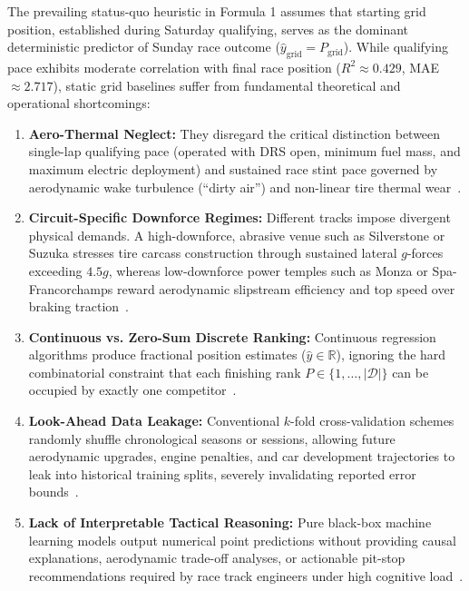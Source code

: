 \documentclass[journal]{IEEEtran}
\begin{document}
The prevailing status-quo heuristic in Formula 1 assumes that starting grid position, established during Saturday qualifying, serves as the dominant deterministic predictor of Sunday race outcome ($\hat{y}_{\text{grid}} = P_{\text{grid}}$). While qualifying pace exhibits moderate correlation with final race position ($R^2 \approx 0.429$, MAE $\approx 2.717$), static grid baselines suffer from fundamental theoretical and operational shortcomings:
\begin{enumerate}
    \item \textbf{Aero-Thermal Neglect:} They disregard the critical distinction between single-lap qualifying pace (operated with DRS open, minimum fuel mass, and maximum electric deployment) and sustained race stint pace governed by aerodynamic wake turbulence (``dirty air'') and non-linear tire thermal wear~\cite{tremlett2015optimal, kelly2020minimum}.
    \item \textbf{Circuit-Specific Downforce Regimes:} Different tracks impose divergent physical demands. A high-downforce, abrasive venue such as Silverstone or Suzuka stresses tire carcass construction through sustained lateral $g$-forces exceeding $4.5g$, whereas low-downforce power temples such as Monza or Spa-Francorchamps reward aerodynamic slipstream efficiency and top speed over braking traction~\cite{pacejka2005tire, bunker2019machine}.
    \item \textbf{Continuous vs. Zero-Sum Discrete Ranking:} Continuous regression algorithms produce fractional position estimates ($\hat{y} \in \mathbb{R}$), ignoring the hard combinatorial constraint that each finishing rank $P \in \{1, \dots, |\mathcal{D}|\}$ can be occupied by exactly one competitor~\cite{burges2005learning, burges2010lambdamart}.
    \item \textbf{Look-Ahead Data Leakage:} Conventional $k$-fold cross-validation schemes randomly shuffle chronological seasons or sessions, allowing future aerodynamic upgrades, engine penalties, and car development trajectories to leak into historical training splits, severely invalidating reported error bounds~\cite{bergmeir2018note}.
    \item \textbf{Lack of Interpretable Tactical Reasoning:} Pure black-box machine learning models output numerical point predictions without providing causal explanations, aerodynamic trade-off analyses, or actionable pit-stop recommendations required by race track engineers under high cognitive load~\cite{bekker2020race}.
\end{enumerate}
\end{document}

